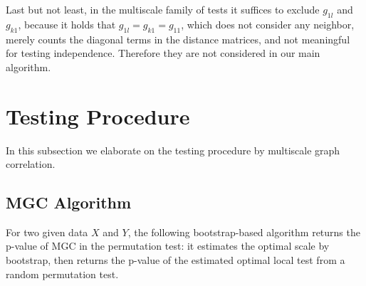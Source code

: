 \documentclass[11pt]{article}
\begin{document}
Last but not least, in the multiscale family of tests it suffices to exclude $g_{1l}$ and $g_{k1}$, because it holds that $g_{1l}=g_{k1}=g_{11}$, which does not consider any neighbor, merely counts the diagonal terms in the distance matrices, and not meaningful for testing independence. Therefore they are not considered in our main algorithm.

\section{Testing Procedure}
\label{main3}

In this subsection we elaborate on the testing procedure by multiscale graph correlation.

\subsection{MGC Algorithm}

For two given data $X$ and $Y$, the following bootstrap-based algorithm returns the p-value of MGC in the permutation test: it estimates the optimal scale by bootstrap, then returns the p-value of the estimated optimal local test from a random permutation test.
\end{document}
